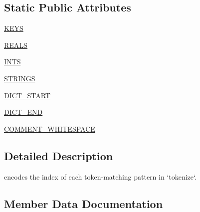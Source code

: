\subsection*{Static Public Attributes}
\begin{DoxyCompactItemize}
\item 
\hyperlink{classnetworkx_1_1readwrite_1_1gml_1_1Pattern_ab12111ffa47c5c22f88ca94f303f9e74}{K\+E\+YS}
\item 
\hyperlink{classnetworkx_1_1readwrite_1_1gml_1_1Pattern_a27fca52f8d725bed1665eef04d04619d}{R\+E\+A\+LS}
\item 
\hyperlink{classnetworkx_1_1readwrite_1_1gml_1_1Pattern_af79dd83a059aeb2c6d7dcc9e46603a10}{I\+N\+TS}
\item 
\hyperlink{classnetworkx_1_1readwrite_1_1gml_1_1Pattern_ae915ddf00d2835304987756391af712c}{S\+T\+R\+I\+N\+GS}
\item 
\hyperlink{classnetworkx_1_1readwrite_1_1gml_1_1Pattern_a2134ea567400d35dd69bedd8db177ab6}{D\+I\+C\+T\+\_\+\+S\+T\+A\+RT}
\item 
\hyperlink{classnetworkx_1_1readwrite_1_1gml_1_1Pattern_ab67ae6dcdbca9d8bfd7a52e6e5101ebc}{D\+I\+C\+T\+\_\+\+E\+ND}
\item 
\hyperlink{classnetworkx_1_1readwrite_1_1gml_1_1Pattern_acb69fda810eca4c3718cdbd000f5bfab}{C\+O\+M\+M\+E\+N\+T\+\_\+\+W\+H\+I\+T\+E\+S\+P\+A\+CE}
\end{DoxyCompactItemize}


\subsection{Detailed Description}
\begin{DoxyVerb}encodes the index of each token-matching pattern in `tokenize`.\end{DoxyVerb}
 

\subsection{Member Data Documentation}
\mbox{\label{classnetworkx_1_1readwrite_1_1gml_1_1Pattern_acb69fda810eca4c3718cdbd000f5bfab}} 
